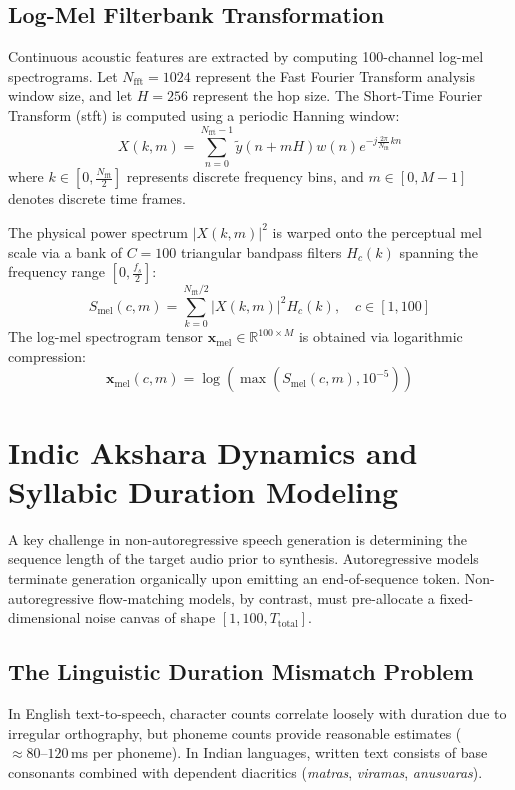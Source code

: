 \subsection{Log-Mel Filterbank Transformation}
Continuous acoustic features are extracted by computing 100-channel log-mel spectrograms. Let $N_{\text{fft}} = 1024$ represent the Fast Fourier Transform analysis window size, and let $H = 256$ represent the hop size. The Short-Time Fourier Transform (\gls{stft}) is computed using a periodic Hanning window:
\begin{equation}
    X(k, m) = \sum_{n=0}^{N_{\text{fft}}-1} \tilde{y}(n + mH) w(n) e^{-j \frac{2\pi}{N_{\text{fft}}} kn}
    \label{eq:stft_analysis}
\end{equation}
where $k \in [0, \frac{N_{\text{fft}}}{2}]$ represents discrete frequency bins, and $m \in [0, M-1]$ denotes discrete time frames. 

The physical power spectrum $|X(k, m)|^2$ is warped onto the perceptual mel scale via a bank of $C = 100$ triangular bandpass filters $H_c(k)$ spanning the frequency range $[0, \frac{f_s}{2}]$:
\begin{equation}
    S_{\text{mel}}(c, m) = \sum_{k=0}^{N_{\text{fft}}/2} |X(k, m)|^2 H_c(k), \quad c \in [1, 100]
    \label{eq:mel_filterbank}
\end{equation}
The log-mel spectrogram tensor $\mathbf{x}_{\text{mel}} \in \mathbb{R}^{100 \times M}$ is obtained via logarithmic compression:
\begin{equation}
    \mathbf{x}_{\text{mel}}(c, m) = \log\left( \max\left( S_{\text{mel}}(c, m), 10^{-5} \right) \right)
    \label{eq:log_compression}
\end{equation}

\section{Indic Akshara Dynamics and Syllabic Duration Modeling}
\label{sec:duration_modeling}
A key challenge in non-autoregressive speech generation is determining the sequence length of the target audio prior to synthesis. Autoregressive models terminate generation organically upon emitting an end-of-sequence token. Non-autoregressive flow-matching models, by contrast, must pre-allocate a fixed-dimensional noise canvas of shape $[1, 100, T_{\text{total}}]$.

\subsection{The Linguistic Duration Mismatch Problem}
In English text-to-speech, character counts correlate loosely with duration due to irregular orthography, but phoneme counts provide reasonable estimates ($\approx 80\text{--}120$\,ms per phoneme). In Indian languages, written text consists of base consonants combined with dependent diacritics (\textit{matras}, \textit{viramas}, \textit{anusvaras}). 

